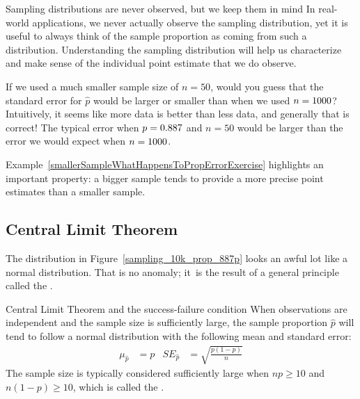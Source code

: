 \begin{onebox}{Sampling distributions are
    never observed, but we keep them in mind}
  In real-world applications, we never actually observe the
  sampling distribution, yet it is useful to always think of
  the sample proportion as coming from such a distribution.
  Understanding the sampling distribution will help us
  characterize and make sense of the individual point
  estimate that we do observe.
\end{onebox}

\begin{examplewrap}
\begin{nexample}{If we used a much smaller sample size of $n = 50$,
would you guess that the standard error for $\hat{p}$ would be larger
or smaller than when we used $n = 1000{}$?}
\label{smallerSampleWhatHappensToPropErrorExercise}
Intuitively, it seems like more data is better
than less data, and generally that is correct! The typical error
when $p = 0.887{}$ and $n = 50$ would be larger
than the error we would expect when $n = 1000{}$.
\end{nexample}
\end{examplewrap}

Example~\ref{smallerSampleWhatHappensToPropErrorExercise}
highlights an important property: a bigger sample
tends to provide a more precise point estimates than a smaller sample.



\subsection{Central Limit Theorem}

The distribution in
Figure~\ref{sampling_10k_prop_887p} looks an awful lot like
a normal distribution. That is no anomaly; it~is the result
of a general principle called the .

\begin{onebox}{Central Limit Theorem and the success-failure condition}
  When observations are independent and the sample size is
  sufficiently large, the sample proportion $\hat{p}$ will tend
  to follow a normal distribution with the following mean and
  standard error:
  \begin{align*}
    \mu_{\hat{p}} &= p
    &SE_{\hat{p}} &= \sqrt{\frac{p (1 - p)}{n}}
  \end{align*}
  The sample size is typically considered sufficiently large when
  $np \geq 10$ and $n(1-p) \geq 10$, which is called the
  .
\end{onebox}

